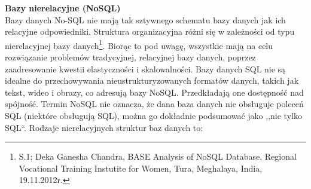 \documentclass[12pt, a4paper, twoside, openany]{book}
\begin{document}
\textbf{Bazy nierelacyjne (NoSQL)}\\
Bazy danych No-SQL nie mają tak sztywnego schematu bazy danych jak ich relacyjne odpowiedniki.
Struktura organizacyjna różni się w zależności od typu nierelacyjnej bazy danych\footnote{S.1; Deka Ganesha Chandra, BASE Analysis of NoSQL Database, Regional Vocational Training Instutite for Women, Tura, Meghalaya, India, 19.11.2012r.}.
Biorąc to pod uwagę, wszystkie mają na celu rozwiązanie problemów tradycyjnej, relacyjnej bazy danych, poprzez zaadresowanie kwestii elastyczności i skalowalności.
Bazy danych SQL nie są idealne do przechowywania nieustrukturyzowanych formatów danych, takich jak tekst, wideo i obrazy, co adresują bazy NoSQL.
Przedkładają one dostępność nad spójność.
Termin NoSQL nie oznacza, że dana baza danych nie obsługuje poleceń SQL (niektóre obsługują SQL), można go dokładnie podsumować jako ,,nie tylko SQL``.
Rodzaje nierelacyjnych struktur baz danych to:
\end{document}
